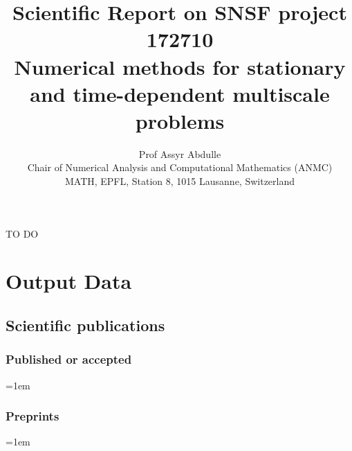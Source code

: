 \documentclass[10pt]{article}
\title{Scientific Report on SNSF project 172710 \\ Numerical methods for stationary and time-dependent multiscale problems}
\author{Prof Assyr Abdulle \\
	Chair of Numerical Analysis and Computational Mathematics (ANMC) \\
	MATH, EPFL, Station 8, 1015 Lausanne, Switzerland
}
\date{}
\begin{document}
	
\maketitle	

{\color{red} TO DO}




\clearpage
\section{Output Data}

\subsection{Scientific publications}

\subsubsection*{Published or accepted}

\sloppy
\emergencystretch=1em
\begin{enumerate}[label={[\arabic*]}]
	\item {}
	\item {}
	\item {}
	\item {}
	\item {}
	\item {}
	\item {}
	\item {}
	\item {}
	\item {}
\end{enumerate}

\subsubsection*{Preprints}

\sloppy
\emergencystretch=1em
\begin{enumerate}[label={[\arabic*]}]
	\item {}
	\item {}
	\item {}
	\item {}
	\item {}
	\item {}
	\item {}
	\item {}
	\item {}
\end{enumerate}
\end{document}
